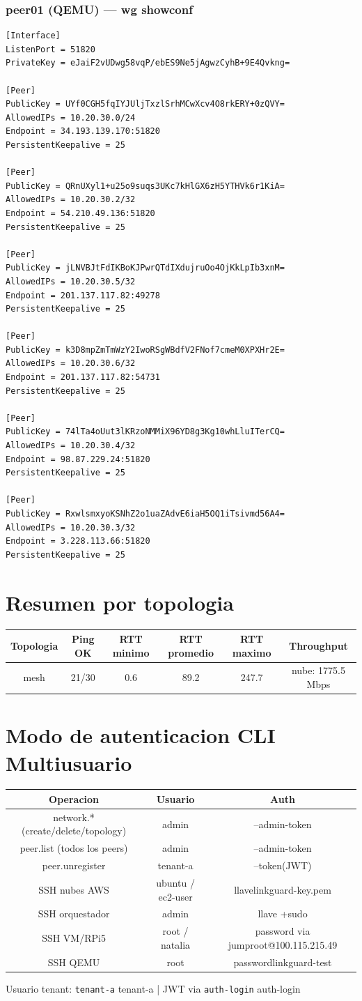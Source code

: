 \documentclass[11pt,a4paper]{article}
\begin{document}
\subsubsection*{peer01 (QEMU) — wg showconf}
\begin{lstlisting}
[Interface]
ListenPort = 51820
PrivateKey = eJaiF2vUDwg58vqP/ebES9Ne5jAgwzCyhB+9E4Qvkng=

[Peer]
PublicKey = UYf0CGH5fqIYJUljTxzlSrhMCwXcv4O8rkERY+0zQVY=
AllowedIPs = 10.20.30.0/24
Endpoint = 34.193.139.170:51820
PersistentKeepalive = 25

[Peer]
PublicKey = QRnUXyl1+u25o9suqs3UKc7kHlGX6zH5YTHVk6r1KiA=
AllowedIPs = 10.20.30.2/32
Endpoint = 54.210.49.136:51820
PersistentKeepalive = 25

[Peer]
PublicKey = jLNVBJtFdIKBoKJPwrQTdIXdujruOo4OjKkLpIb3xnM=
AllowedIPs = 10.20.30.5/32
Endpoint = 201.137.117.82:49278
PersistentKeepalive = 25

[Peer]
PublicKey = k3D8mpZmTmWzY2IwoRSgWBdfV2FNof7cmeM0XPXHr2E=
AllowedIPs = 10.20.30.6/32
Endpoint = 201.137.117.82:54731
PersistentKeepalive = 25

[Peer]
PublicKey = 74lTa4oUut3lKRzoNMMiX96YD8g3Kg10whLluITerCQ=
AllowedIPs = 10.20.30.4/32
Endpoint = 98.87.229.24:51820
PersistentKeepalive = 25

[Peer]
PublicKey = RxwlsmxyoKSNhZ2o1uaZAdvE6iaH5OQ1iTsivmd56A4=
AllowedIPs = 10.20.30.3/32
Endpoint = 3.228.113.66:51820
PersistentKeepalive = 25

\end{lstlisting}

\section{Resumen por topologia}
\begin{longtable}{|c|c|c|c|c|c|}
\hline
Topologia & Ping OK & RTT minimo & RTT promedio & RTT maximo & Throughput \\ \hline
mesh & 21/30 & 0.6 & 89.2 & 247.7 & nube: 1775.5 Mbps \\ \hline
\end{longtable}

\section{Modo de autenticacion CLI Multiusuario}
\begin{longtable}{|c|c|c|}
\hline
Operacion & Usuario & Auth \\ \hline
network.* (create/delete/topology) & admin & --admin-token \\ \hline
peer.list (todos los peers) & admin & --admin-token \\ \hline
peer.unregister & tenant-a & --token(JWT) \\ \hline
SSH nubes AWS & ubuntu / ec2-user & llavelinkguard-key.pem \\ \hline
SSH orquestador & admin & llave +sudo \\ \hline
SSH VM/RPi5 & root / natalia & password via jumproot@100.115.215.49 \\ \hline
SSH QEMU & root & passwordlinkguard-test \\ \hline
\end{longtable}

Usuario tenant:  \texttt{tenant-a} tenant-a  | JWT via  \texttt{auth-login} auth-login\\
\end{document}
